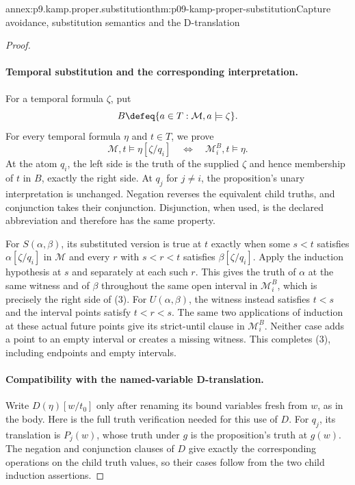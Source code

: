 \begin{annexitem}{annex:p9.kamp.proper.substitution}{thm:p09-kamp-proper-substitution}{Capture avoidance, substitution semantics and the D-translation}
\begin{proof}
\paragraph{Temporal substitution and the corresponding interpretation.}
For a temporal formula \(\zeta\), put
\[
                 B\defeq\{a\in T:\mathcal M,a\models\zeta\}.
\]
For every temporal formula \(\eta\) and \(t\in T\), we prove
\[
 \mathcal M,t\models\eta[\zeta/q_i]
 \quad\Longleftrightarrow\quad
                           \mathcal M_i^B,t\models\eta.
\tag{3}
\]
At the atom \(q_i\), the left side is the truth of the supplied
\(\zeta\) and hence membership of \(t\) in \(B\), exactly the
right side. At \(q_j\) for \(j\ne i\), the proposition's unary
interpretation is unchanged. Negation reverses the equivalent child
truths, and conjunction takes their conjunction. Disjunction, when used,
is the declared abbreviation and therefore has the same property.

For \(S(\alpha,\beta)\), its substituted version is true at \(t\)
exactly when some \(s<t\) satisfies \(\alpha[\zeta/q_i]\) in
\(\mathcal M\) and every \(r\) with \(s<r<t\) satisfies
\(\beta[\zeta/q_i]\). Apply the induction hypothesis at \(s\)
and separately at each such \(r\). This gives the truth of
\(\alpha\) at the same witness and of \(\beta\) throughout the
same open interval in \(\mathcal M_i^B\), which is precisely the
right side of (3). For \(U(\alpha,\beta)\), the witness instead
satisfies \(t<s\) and the interval points satisfy \(t<r<s\).
The same two applications of induction at these actual future points
give its strict-until clause in \(\mathcal M_i^B\). Neither case
adds a point to an empty interval or creates a missing witness. This
completes (3), including endpoints and empty intervals.

\paragraph{Compatibility with the named-variable D-translation.}
Write \(D(\eta)[w/t_0]\) only after renaming its bound variables
fresh from \(w\), as in the body. Here is the full truth verification
needed for this use of \(D\). For \(q_j\), its translation is
\(P_j(w)\), whose truth under \(g\) is the proposition's truth at
\(g(w)\). The negation and conjunction clauses of \(D\) give exactly
the corresponding operations on the child truth values, so their cases
follow from the two child induction assertions.


\end{proof}
\end{annexitem}
